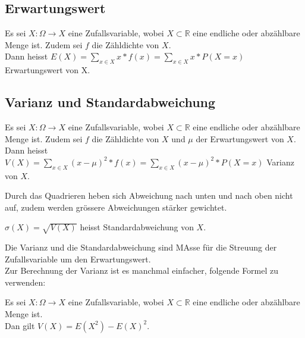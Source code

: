 \documentclass[10pt]{article}
\newtheorem[M]{definition}{Def.}
\newtheorem[M]{satz}{Satz}
\numberwithin{equation}{section}
\newcommand{\RN}{\mathbb{R}} %
\begin{document}
\subsection{Erwartungswert}
\begin{definition}[Erwartungswert]
Es sei $X : \Omega \rightarrow X$ eine Zufallsvariable, wobei $X \subset \RN$ eine endliche oder abzählbare Menge ist. Zudem sei $f$ die Zähldichte von $X$. \\
Dann heisst $E(X)=\sum_{x \in X} x * f(x)=\sum_{x \in X} x * P(X = x)$ Erwartungswert von X.
\end{definition}

\subsection{Varianz und Standardabweichung}
\begin{definition}[Varianz]
Es sei $X : \Omega \rightarrow X$ eine Zufallsvariable, wobei $X \subset \RN$ eine endliche oder abzählbare Menge ist. Zudem sei $f$ die Zähldichte von $X$ und $\mu$ der Erwartungswert von $X$. \\
Dann heisst $V(X) = \sum_{x \in X} (x - \mu)^2 * f(x) = \sum_{x \in X} (x - \mu)^2 * P(X=x)$ Varianz von $X$.
\end{definition}
Durch das Quadrieren heben sich Abweichung nach unten und nach oben nicht auf, zudem werden grössere Abweichungen stärker gewichtet. \\
\begin{definition}[Standardabweichung]
$\sigma(X) = \sqrt{V(X)}$ heisst Standardabweichung von $X$.\\
\end{definition}
Die Varianz und die Standardabweichung sind MAsse für die Streuung der Zufallsvariable um den Erwartungswert. \\
Zur Berechnung der Varianz ist es manchmal einfacher, folgende Formel zu verwenden:
\begin{satz}
Es sei $X : \Omega \rightarrow X$ eine Zufallsvariable, wobei $X \subset \RN$ eine endliche oder abzählbare Menge ist. \\
Dan gilt $V(X) = E(X^2)-E(X)^2$.
\end{satz}
\end{document}
